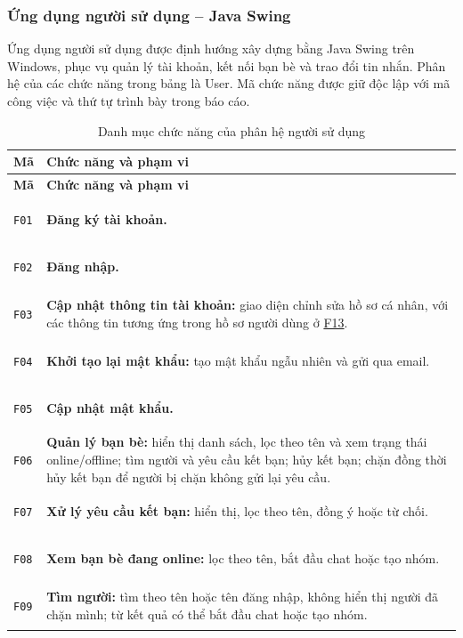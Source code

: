 \subsubsection{Ứng dụng người sử dụng -- Java Swing}
\label{subsubsec:client-user}

Ứng dụng người sử dụng được định hướng xây dựng bằng Java Swing trên Windows,
phục vụ quản lý tài khoản, kết nối bạn bè và trao đổi tin nhắn. Phân hệ của
các chức năng trong bảng là User. Mã chức năng được giữ độc lập với mã
công việc và thứ tự trình bày trong báo cáo.

\begingroup
\small
\begin{longtable}{|C{1.2cm}|L{\dimexpr\textwidth-1.2cm-4\arrayrulewidth\relax}|}
  \caption{Danh mục chức năng của phân hệ người sử dụng}
  \label{tab:chuc-nang-user}\\
  \hline
  \textbf{Mã} & \textbf{Chức năng và phạm vi}\\
  \hline
  \endfirsthead
  \hline
  \textbf{Mã} & \textbf{Chức năng và phạm vi}\\
  \hline
  \endhead
  \hypertarget{F01}{\texttt{F01}} & \textbf{Đăng ký tài khoản.}\\
  \hline
  \hypertarget{F02}{\texttt{F02}} & \textbf{Đăng nhập.}\\
  \hline
  \hypertarget{F03}{\texttt{F03}} &
  \textbf{Cập nhật thông tin tài khoản:} giao diện chỉnh sửa hồ sơ cá nhân,
  với các thông tin tương ứng trong hồ sơ người dùng ở
  \hyperlink{F13}{F13}.\\
  \hline
  \hypertarget{F04}{\texttt{F04}} &
  \textbf{Khởi tạo lại mật khẩu:} tạo mật khẩu ngẫu nhiên và gửi qua email.\\
  \hline
  \hypertarget{F05}{\texttt{F05}} & \textbf{Cập nhật mật khẩu.}\\
  \hline
  \hypertarget{F06}{\texttt{F06}} &
  \textbf{Quản lý bạn bè:} hiển thị danh sách, lọc theo tên và xem trạng thái
  online/offline; tìm người và yêu cầu kết bạn; hủy kết bạn; chặn đồng thời
  hủy kết bạn để người bị chặn không gửi lại yêu cầu.\\
  \hline
  \hypertarget{F07}{\texttt{F07}} &
  \textbf{Xử lý yêu cầu kết bạn:} hiển thị, lọc theo tên, đồng ý hoặc từ chối.\\
  \hline
  \hypertarget{F08}{\texttt{F08}} &
  \textbf{Xem bạn bè đang online:} lọc theo tên, bắt đầu chat hoặc tạo nhóm.\\
  \hline
  \hypertarget{F09}{\texttt{F09}} &
  \textbf{Tìm người:} tìm theo tên hoặc tên đăng nhập, không hiển thị người
  đã chặn mình; từ kết quả có thể bắt đầu chat hoặc tạo nhóm.\\

\end{longtable}
